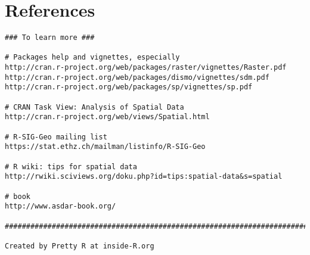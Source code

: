 \documentclass[11pt]{article} %
\begin{document}
\section{References}
\begin{verbatim}
### To learn more ###
 
# Packages help and vignettes, especially
http://cran.r-project.org/web/packages/raster/vignettes/Raster.pdf
http://cran.r-project.org/web/packages/dismo/vignettes/sdm.pdf
http://cran.r-project.org/web/packages/sp/vignettes/sp.pdf
 
# CRAN Task View: Analysis of Spatial Data
http://cran.r-project.org/web/views/Spatial.html
 
# R-SIG-Geo mailing list
https://stat.ethz.ch/mailman/listinfo/R-SIG-Geo
 
# R wiki: tips for spatial data
http://rwiki.sciviews.org/doku.php?id=tips:spatial-data&s=spatial
 
# book
http://www.asdar-book.org/
 
############################################################################

Created by Pretty R at inside-R.org


\end{verbatim}
\end{document}
